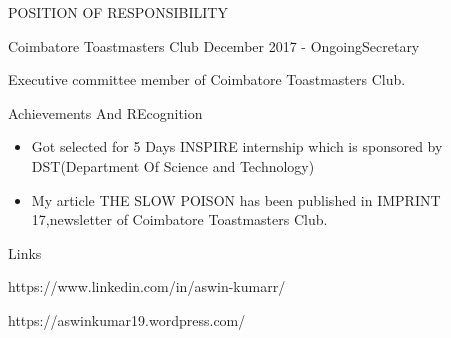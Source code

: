 \documentclass{resume} %
\begin{document}




\begin{rSection}{POSITION OF RESPONSIBILITY}

\begin{rSubsection}{Coimbatore Toastmasters Club }{December 2017 - Ongoing}{Secretary}{}
\item Executive committee member of Coimbatore Toastmasters Club. 

\end{rSubsection}



\end{rSection}
\begin{rSection}{Achievements And REcognition} \itemsep -3pt
\item 
\begin{itemize}
\item Got selected for 5 Days INSPIRE internship which is sponsored by DST(Department Of Science and Technology)
\item My article  THE SLOW POISON has been published in IMPRINT 17,newsletter of Coimbatore Toastmasters Club. 
\end{itemize}

\end{rSection}


\begin{rSection}{Links} \itemsep -3pt
\item https://www.linkedin.com/in/aswin-kumarr/
\item https://aswinkumar19.wordpress.com/

\end{rSection}
\end{document}
